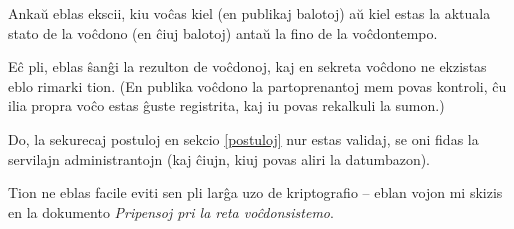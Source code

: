 \documentclass[draft]{scrartcl}
\begin{document}
Ankaŭ eblas ekscii, kiu voĉas kiel (en publikaj balotoj) aŭ kiel
estas la aktuala stato de la voĉdono (en ĉiuj balotoj) antaŭ la fino
de la voĉdontempo.

Eĉ pli, eblas ŝanĝi la rezulton de voĉdonoj, kaj
en sekreta voĉdono ne ekzistas eblo rimarki tion. (En publika voĉdono
la partoprenantoj mem povas kontroli, ĉu ilia propra voĉo estas
ĝuste registrita, kaj iu povas rekalkuli la sumon.)

Do, la sekurecaj postuloj en sekcio \ref{postuloj} nur estas validaj, se
oni fidas la servilajn administrantojn (kaj ĉiujn, kiuj povas aliri la
datumbazon).


Tion ne eblas facile eviti sen pli larĝa uzo de kriptografio -- eblan
vojon mi skizis en la dokumento \emph{Pripensoj pri la reta voĉdonsistemo}.
\end{document}
